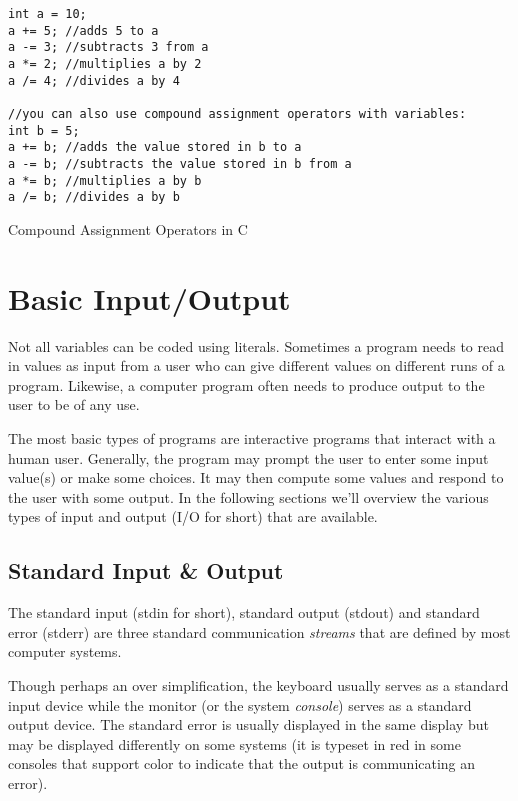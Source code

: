 \begin{listing}
\begin{verbatim}
int a = 10;
a += 5; //adds 5 to a
a -= 3; //subtracts 3 from a
a *= 2; //multiplies a by 2
a /= 4; //divides a by 4

//you can also use compound assignment operators with variables:
int b = 5;
a += b; //adds the value stored in b to a
a -= b; //subtracts the value stored in b from a
a *= b; //multiplies a by b
a /= b; //divides a by b
\end{verbatim}
\caption{Compound Assignment Operators in C}
\label{code:compoundAssignmentOperatorsInC}
\end{listing}

\section{Basic Input/Output}

Not all variables can be coded using literals.  Sometimes a program
needs to read in values as \gls{input} from a user who can give
different values on different runs of a program.  Likewise, a computer
program often needs to produce \gls{output} to the user to be
of any use.  

The most basic types of programs are \gls{interactive} programs that
interact with a human user.  Generally, the program may \gls{prompt} the
user to enter some input value(s) or make some choices.  It may then
compute some values and respond to the user with some output.
In the following sections we'll overview the various types of input
and output (I/O for short) that are available.

\subsection{Standard Input \& Output}

The standard input (stdin for short), standard output (stdout) and standard error
(stderr) are three standard communication \emph{streams} that are defined by
most computer systems.

Though perhaps an over simplification, the keyboard usually serves as a 
standard input device while the monitor (or the system \emph{console}) serves as a 
standard output device.  The standard error is usually displayed in the same
display but may be displayed differently on some systems (it is typeset in red
in some consoles that support color to indicate that the output is communicating
an error).

